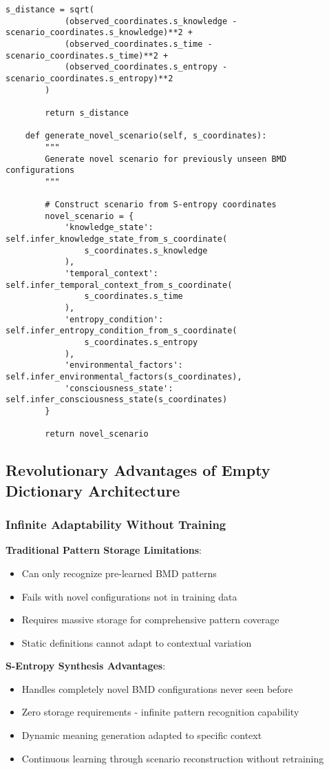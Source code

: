 \documentclass[12pt,a4paper]{article}
\begin{document}
\begin{lstlisting}[style=pythonstyle, caption=S-Entropy Scenario Reconstruction for Meaning Synthesis]
        s_distance = sqrt(
            (observed_coordinates.s_knowledge - scenario_coordinates.s_knowledge)**2 +
            (observed_coordinates.s_time - scenario_coordinates.s_time)**2 +
            (observed_coordinates.s_entropy - scenario_coordinates.s_entropy)**2
        )
        
        return s_distance
    
    def generate_novel_scenario(self, s_coordinates):
        """
        Generate novel scenario for previously unseen BMD configurations
        """
        
        # Construct scenario from S-entropy coordinates
        novel_scenario = {
            'knowledge_state': self.infer_knowledge_state_from_s_coordinate(
                s_coordinates.s_knowledge
            ),
            'temporal_context': self.infer_temporal_context_from_s_coordinate(
                s_coordinates.s_time  
            ),
            'entropy_condition': self.infer_entropy_condition_from_s_coordinate(
                s_coordinates.s_entropy
            ),
            'environmental_factors': self.infer_environmental_factors(s_coordinates),
            'consciousness_state': self.infer_consciousness_state(s_coordinates)
        }
        
        return novel_scenario
\end{lstlisting}

\subsection{Revolutionary Advantages of Empty Dictionary Architecture}

\subsubsection{Infinite Adaptability Without Training}

\textbf{Traditional Pattern Storage Limitations}:
\begin{itemize}
\item Can only recognize pre-learned BMD patterns
\item Fails with novel configurations not in training data
\item Requires massive storage for comprehensive pattern coverage
\item Static definitions cannot adapt to contextual variation
\end{itemize}

\textbf{S-Entropy Synthesis Advantages}:
\begin{itemize}
\item Handles completely novel BMD configurations never seen before
\item Zero storage requirements - infinite pattern recognition capability
\item Dynamic meaning generation adapted to specific context
\item Continuous learning through scenario reconstruction without retraining
\end{itemize}
\end{document}
